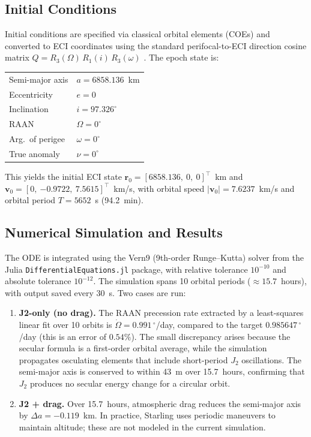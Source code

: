 \documentclass[12pt]{article}
\begin{document}
\subsection{Initial Conditions}

Initial conditions are specified via classical orbital elements (COEs) and converted to ECI
coordinates using the standard perifocal-to-ECI direction cosine matrix
$Q = R_3(\Omega)\,R_1(i)\,R_3(\omega)$ \cite{Vallado2013}.
The epoch state is:

\begin{center}
\begin{tabular}{ll}
Semi-major axis   & $a = 6858.136$~km \\
Eccentricity      & $e = 0$ \\
Inclination       & $i = 97.326^\circ$ \\
RAAN              & $\Omega = 0^\circ$ \\
Arg.\ of perigee  & $\omega = 0^\circ$ \\
True anomaly      & $\nu = 0^\circ$ \\
\end{tabular}
\end{center}

This yields the initial ECI state
$\mathbf{r}_0 = [6858.136,\ 0,\ 0]^\top$~km and
$\mathbf{v}_0 = [0,\ {-0.9722},\ 7.5615]^\top$~km/s,
with orbital speed $|\mathbf{v}_0| = 7.6237$~km/s and
orbital period $T = 5652$~s (94.2~min).

\subsection{Numerical Simulation and Results}

The ODE is integrated using the Vern9 (9th-order Runge--Kutta) solver from the
Julia \texttt{DifferentialEquations.jl} package, with relative tolerance $10^{-10}$
and absolute tolerance $10^{-12}$.
The simulation spans 10 orbital periods ($\approx 15.7$~hours), with output saved every 30~s.
Two cases are run:

\begin{enumerate}
    \item \textbf{J2-only (no drag).}
    The RAAN precession rate extracted by a least-squares linear fit over 10 orbits is
    $\dot\Omega = 0.991\,^\circ$/day, compared to the target $0.985647\,^\circ$/day
    (this is an error of $0.54\%$).
    The small discrepancy arises because the secular formula is a first-order orbital average,
    while the simulation propagates osculating elements that include short-period
    $J_2$ oscillations.
    The semi-major axis is conserved to within 43~m over 15.7~hours, confirming that
    $J_2$ produces no secular energy change for a circular orbit.

    \item \textbf{J2 + drag.}
    Over 15.7~hours, atmospheric drag reduces the semi-major axis by
    $\Delta a = -0.119$~km.
    In practice, Starling uses periodic maneuvers to maintain altitude; these are not
    modeled in the current simulation.
\end{enumerate}
\end{document}
